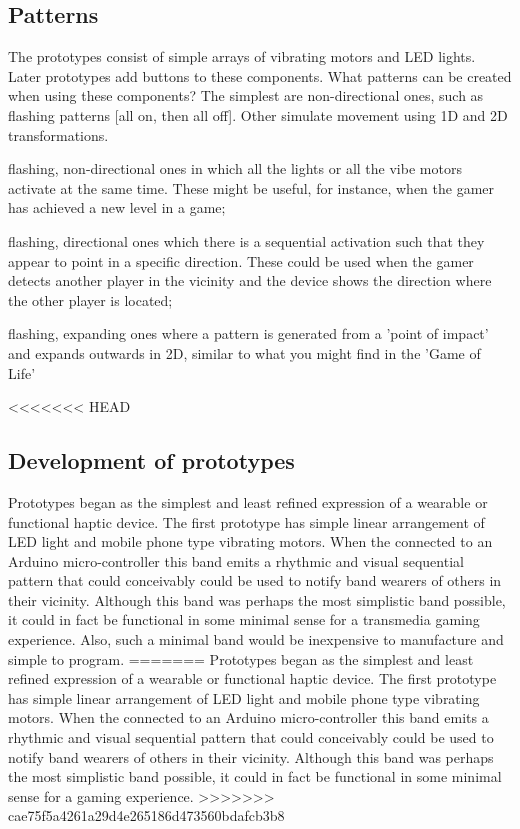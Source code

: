 \documentclass{chi-ext}
\begin{document}
\subsection{Patterns}
The prototypes consist of simple arrays of vibrating motors and LED lights. Later prototypes add buttons to these components. What patterns can be created when using these components? The simplest are non-directional ones, such as flashing patterns [all on, then all off]. Other simulate movement using 1D and 2D transformations.

\begin{inparaenum}
\item flashing, non-directional ones in which all the lights or all the vibe motors activate at the same time. These might be useful, for instance, when the gamer has achieved a new level in a game;
\item flashing, directional ones which there is a sequential activation such that they appear to point in a specific direction. These could be used when the gamer detects another player in the vicinity and the device shows the direction where the other player is located;
\item flashing, expanding ones where a pattern is generated from a 'point of impact' and expands outwards in 2D, similar to what you might find in the 'Game of Life'
\end{inparaenum}

<<<<<<< HEAD
\subsection{ Development of prototypes}
Prototypes began as the simplest and least refined expression of a wearable or functional haptic device. The first prototype has simple linear arrangement of LED light and mobile phone type vibrating motors. When the connected to an Arduino micro-controller this band emits a rhythmic and visual sequential pattern that could conceivably could be used to notify band wearers of others in their vicinity. Although this band was perhaps the most simplistic band possible, it could in fact be functional in some minimal sense for a transmedia gaming experience. Also, such a minimal band would be inexpensive to manufacture and simple to program. 
=======
Prototypes began as the simplest and least refined expression of a wearable or functional haptic device. The first prototype has simple linear arrangement of LED light and mobile phone type vibrating motors. When the connected to an Arduino micro-controller this band emits a rhythmic and visual sequential pattern that could conceivably could be used to notify band wearers of others in their vicinity. Although this band was perhaps the most simplistic band possible, it could in fact be functional in some minimal sense for a gaming experience. 
>>>>>>> cae75f5a4261a29d4e265186d473560bdafcb3b8
\end{document}

